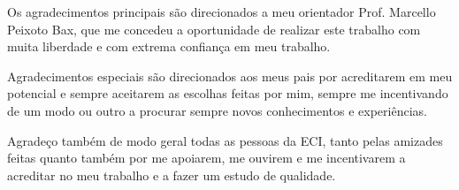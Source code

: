 \documentclass[
	12pt,               %
	openright,          %
	twoside,            %
	a4paper,            %
	english,            %
	brazil              %
	]{abntex2}
\begin{document}
\begin{agradecimentos}

Os agradecimentos principais são direcionados a meu orientador Prof. Marcello Peixoto Bax, que me concedeu a oportunidade de realizar este trabalho com muita liberdade e com extrema confiança em meu trabalho.

Agradecimentos especiais são direcionados aos meus pais por acreditarem em meu potencial e sempre aceitarem as escolhas feitas por mim, sempre me incentivando de um modo ou outro a procurar sempre novos conhecimentos e experiências.

Agradeço também de modo geral todas as pessoas da ECI, tanto pelas amizades feitas quanto também por me apoiarem, me ouvirem e me incentivarem a acreditar no meu trabalho e a fazer um estudo de qualidade.

\end{agradecimentos}


\end{document}
